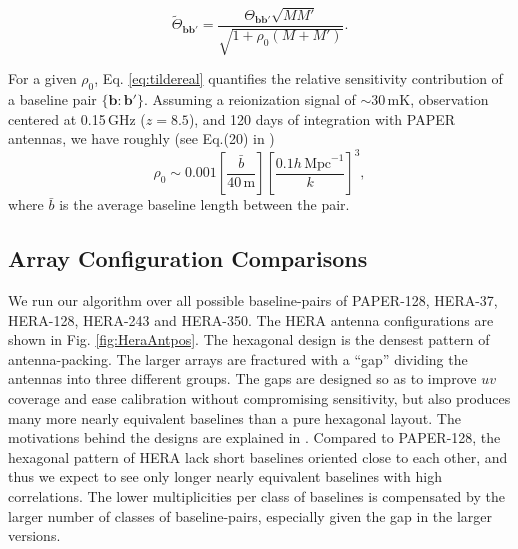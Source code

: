 \documentclass[twocolumn,apj,numberedappendix]{emulateapj}
\renewcommand\[{\begin{equation}}
\renewcommand\]{\end{equation}}
\begin{document}
\begin{equation}
\label{eq:tildereal}
\widetilde{\Theta}_{\boldsymbol{bb'}} =\frac{\Theta_{\boldsymbol{bb'}}\sqrt{MM'}}{\sqrt{1 + \rho_0 \left(M+M' \right)}}.
\end{equation}

For a given $\rho_0$, Eq. \eqref{eq:tildereal} quantifies the relative sensitivity contribution of a baseline pair $\{\boldsymbol{b}:\boldsymbol{b'}\}$. Assuming a reionization signal of $\sim 30\,\text{mK}$, observation centered at 0.15\,GHz ($z=8.5$), and 120 days of integration with PAPER antennas, we have roughly
(see Eq.(20) in \citealt{first-paper})
\begin{equation}
\rho_0 \sim 0.001\left[\frac{\bar{b}}{40\,\text{m}}\right] \left[\frac{0.1h\,\text{Mpc}^{-1}}{k}\right]^3, 
\end{equation}
where $\bar{b}$ is the average baseline length between the pair.  

\subsection{Array Configuration Comparisons \label{sec:arrconf}}
We run our algorithm over all possible baseline-pairs of  PAPER-128, HERA-37, HERA-128, HERA-243 and HERA-350. The HERA antenna configurations are shown in Fig. \ref{fig:HeraAntpos}. The  
hexagonal design is the densest pattern of antenna-packing. The larger arrays are fractured with a ``gap'' dividing the antennas into three different groups. The gaps are designed so as to improve $uv$ coverage and ease calibration without compromising sensitivity, but also produces many more nearly equivalent baselines than a pure hexagonal layout. The motivations behind the designs are explained in \cite{JoshAntPos}.  Compared to PAPER-128, the hexagonal pattern of HERA lack short baselines oriented close to each other, and thus we expect to see only longer nearly equivalent baselines with high correlations. The lower multiplicities per class of baselines is compensated by the larger number of classes of baseline-pairs, especially given the gap in the larger versions. 
\end{document}
